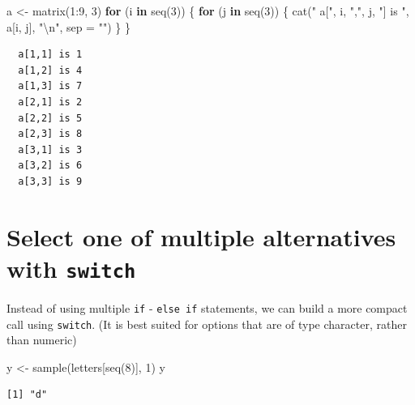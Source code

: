 \documentclass[
]{book}
\newenvironment{Shaded}{\begin{snugshade}}{\end{snugshade}}
\newcommand{\AttributeTok}[1]{\textcolor[rgb]{0.77,0.63,0.00}{#1}}
\newcommand{\ControlFlowTok}[1]{\textcolor[rgb]{0.13,0.29,0.53}{\textbf{#1}}}
\newcommand{\DecValTok}[1]{\textcolor[rgb]{0.00,0.00,0.81}{#1}}
\newcommand{\FunctionTok}[1]{\textcolor[rgb]{0.00,0.00,0.00}{#1}}
\newcommand{\NormalTok}[1]{#1}
\newcommand{\OtherTok}[1]{\textcolor[rgb]{0.56,0.35,0.01}{#1}}
\newcommand{\SpecialCharTok}[1]{\textcolor[rgb]{0.00,0.00,0.00}{#1}}
\newcommand{\StringTok}[1]{\textcolor[rgb]{0.31,0.60,0.02}{#1}}
\begin{document}
\begin{Shaded}
\begin{Highlighting}[]
\NormalTok{a }\OtherTok{\textless{}{-}} \FunctionTok{matrix}\NormalTok{(}\DecValTok{1}\SpecialCharTok{:}\DecValTok{9}\NormalTok{, }\DecValTok{3}\NormalTok{)}
\ControlFlowTok{for}\NormalTok{ (i }\ControlFlowTok{in} \FunctionTok{seq}\NormalTok{(}\DecValTok{3}\NormalTok{)) \{}
  \ControlFlowTok{for}\NormalTok{ (j }\ControlFlowTok{in} \FunctionTok{seq}\NormalTok{(}\DecValTok{3}\NormalTok{)) \{}
    \FunctionTok{cat}\NormalTok{(}\StringTok{"  a["}\NormalTok{, i, }\StringTok{","}\NormalTok{, j, }\StringTok{"] is "}\NormalTok{, a[i, j], }\StringTok{"}\SpecialCharTok{\textbackslash{}n}\StringTok{"}\NormalTok{, }\AttributeTok{sep =} \StringTok{""}\NormalTok{)}
\NormalTok{  \}}
\NormalTok{\}}
\end{Highlighting}
\end{Shaded}

\begin{verbatim}
  a[1,1] is 1
  a[1,2] is 4
  a[1,3] is 7
  a[2,1] is 2
  a[2,2] is 5
  a[2,3] is 8
  a[3,1] is 3
  a[3,2] is 6
  a[3,3] is 9
\end{verbatim}

\hypertarget{select-one-of-multiple-alternatives-with-switch}{%
\section{\texorpdfstring{Select one of multiple alternatives with \texttt{switch}}{Select one of multiple alternatives with switch}}\label{select-one-of-multiple-alternatives-with-switch}}

Instead of using multiple \texttt{if} - \texttt{else\ if} statements, we can build a more compact call using \texttt{switch}. (It is best suited for options that are of type character, rather than numeric)

\begin{Shaded}
\begin{Highlighting}[]
\NormalTok{y }\OtherTok{\textless{}{-}} \FunctionTok{sample}\NormalTok{(letters[}\FunctionTok{seq}\NormalTok{(}\DecValTok{8}\NormalTok{)], }\DecValTok{1}\NormalTok{)}
\NormalTok{y}
\end{Highlighting}
\end{Shaded}

\begin{verbatim}
[1] "d"
\end{verbatim}
\end{document}
